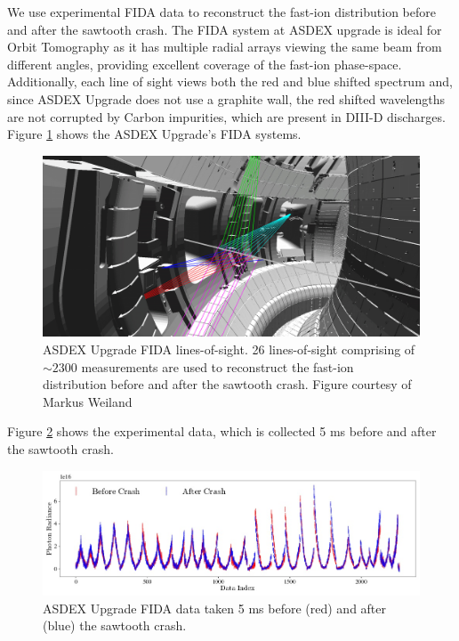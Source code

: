 We use experimental FIDA data to reconstruct the fast-ion distribution before and after the sawtooth crash. The FIDA system at ASDEX upgrade is ideal for Orbit Tomography as it has multiple radial arrays viewing the same beam from different angles, providing excellent coverage of the fast-ion phase-space. Additionally, each line of sight views both the red and blue shifted spectrum and, since ASDEX Upgrade does not use a graphite wall, the red shifted wavelengths are not corrupted by Carbon impurities, which are present in DIII-D discharges. Figure \ref{fig:augd_chords} shows the ASDEX Upgrade's FIDA systems.
\begin{figure}[h!]
    \centering
    \includegraphics[width=16cm]{figures/augd_chords.jpg}
    \caption{ASDEX Upgrade FIDA lines-of-sight. 26 lines-of-sight comprising of $\sim2300$ measurements are used to reconstruct the fast-ion distribution before and after the sawtooth crash. Figure courtesy of Markus Weiland\cite{weiland2016}}
    \label{fig:augd_chords}
\end{figure}
Figure \ref{fig:augd_data} shows the experimental data, which is collected 5 ms before and after the sawtooth crash. 
\begin{figure}[h!]
    \centering
    \includegraphics[width=16cm]{figures/sawtooth_data.jpg}
    \caption{ASDEX Upgrade FIDA data taken 5 ms before (red) and after (blue) the sawtooth crash.}
    \label{fig:augd_data}
\end{figure}

